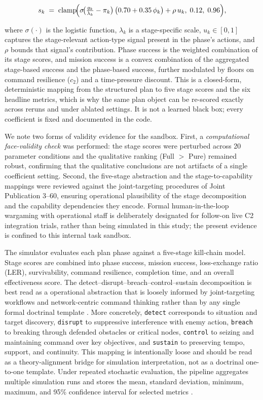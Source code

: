 \begin{equation}
s_k \;=\; \operatorname{clamp}\!\Bigl(\sigma\!\bigl(\tfrac{g_k}{\lambda_k} - \pi_k\bigr)\,\bigl(0.70 + 0.35\,\phi_k\bigr) + \rho\,u_k,\; 0.12,\; 0.96\Bigr),
\end{equation}

where $\sigma(\cdot)$ is the logistic function, $\lambda_k$ is a stage-specific scale, $u_k \in [0,1]$ captures the stage-relevant action-type signal present in the phase's actions, and $\rho$ bounds that signal's contribution. Phase success is the weighted combination of its stage scores, and mission success is a convex combination of the aggregated stage-based success and the phase-based success, further modulated by floors on command resilience ($c_2$) and a time-pressure discount. This is a closed-form, deterministic mapping from the structured plan to five stage scores and the six headline metrics, which is why the same plan object can be re-scored exactly across reruns and under ablated settings. It is not a learned black box; every coefficient is fixed and documented in the code.

We note two forms of validity evidence for the sandbox. First, a \emph{computational face-validity check} was performed: the stage scores were perturbed across 20 parameter conditions and the qualitative ranking (Full $>$ Pure) remained robust, confirming that the qualitative conclusions are not artifacts of a single coefficient setting. Second, the five-stage abstraction and the stage-to-capability mappings were reviewed against the joint-targeting procedures of Joint Publication 3--60, ensuring operational plausibility of the stage decomposition and the capability dependencies they encode. Formal human-in-the-loop wargaming with operational staff is deliberately designated for follow-on live C2 integration trials, rather than being simulated in this study; the present evidence is confined to this internal task sandbox.

The simulator evaluates each plan phase against a five-stage kill-chain model. Stage scores are combined into phase success, mission success, loss-exchange ratio (LER), survivability, command resilience, completion time, and an overall effectiveness score. The detect--disrupt--breach--control--sustain decomposition is best read as a operational abstraction that is loosely informed by joint-targeting workflows and network-centric command thinking rather than by any single formal doctrinal template \citep{jointchiefs2013jointtargeting,tirpak2000f2t2ea,alberts1999networkcentric}. More concretely, \texttt{detect} corresponds to situation and target discovery, \texttt{disrupt} to suppressive interference with enemy action, \texttt{breach} to breaking through defended obstacles or critical nodes, \texttt{control} to seizing and maintaining command over key objectives, and \texttt{sustain} to preserving tempo, support, and continuity. This mapping is intentionally loose and should be read as a theory-alignment bridge for simulation interpretation, not as a doctrinal one-to-one template. Under repeated stochastic evaluation, the pipeline aggregates multiple simulation runs and stores the mean, standard deviation, minimum, maximum, and 95\% confidence interval for selected metrics \citep{law2015simulation}.

